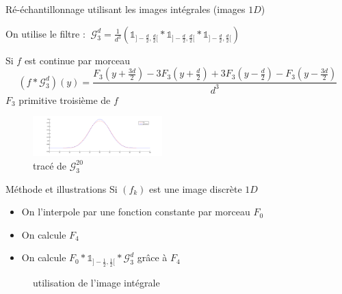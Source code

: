 \documentclass[c,12pt]{beamer}
\begin{document}
\begin{frame}{Ré-échantillonnage utilisant les images intégrales (images $1D$)}
\small{
On utilise le filtre :
$~
\mathcal{G}_3^d= \frac{1}{d^3}(\mathds{1}_{]-\frac{d}{2},\frac{d}{2}[} * \mathds{1}_{]-\frac{d}{2},\frac{d}{2}[} * \mathds{1}_{]-\frac{d}{2},\frac{d}{2}[})
$
\begin{block}{Si $f$ est continue par morceau}
\begin{equation*}
(f*\mathcal{G}_3^d)(y)=\frac{F_3(y+\frac{3d}{2})-3F_3(y+\frac{d}{2})+3F_3(y-\frac{d}{2})-F_3(y-\frac{3d}{2})}{d^3}
\end{equation*}
$F_3$ primitive troisième de $f$
\end{block}}
\begin{figure}
\centering
\includegraphics[width=5cm]{filtre_g3.png}
\caption{tracé de $\mathcal{G}_3^20$}
\end{figure}
\end{frame}
\begin{frame}{Méthode et illustrations}
Si $(f_k)$ est une image discrète $1D$ 
\begin{itemize}
\item On l'interpole par une fonction constante par morceau $F_0$
\item On calcule $F_4$   
\item On calcule $F_0 *\mathds{1}_{]-\frac{1}{2},\frac{1}{2}[}*\mathcal{G}_3^d$ grâce à $F_4$
\end{itemize}
\begin{figure}
\centering
{}
\caption{utilisation de l'image intégrale}
\end{figure}
\end{frame}
\end{document}

